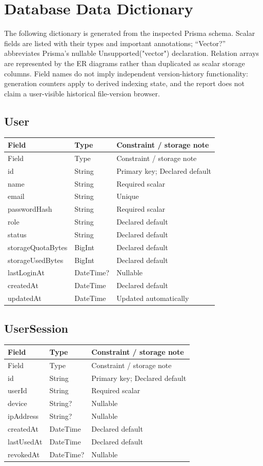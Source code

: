 \chapter{Database Data Dictionary}
The following dictionary is generated from the inspected Prisma schema. Scalar fields are listed with their types and important annotations; ``Vector?'' abbreviates Prisma's nullable Unsupported("vector") declaration. Relation arrays are represented by the ER diagrams rather than duplicated as scalar storage columns. Field names do not imply independent version-history functionality: generation counters apply to derived indexing state, and the report does not claim a user-visible historical file-version browser.

\section{User}
\begin{longtable}{p{.31\linewidth}p{.23\linewidth}p{.36\linewidth}}\toprule Field&Type&Constraint / storage note\\\midrule\endfirsthead\toprule Field&Type&Constraint / storage note\\\midrule\endhead
id&String&Primary key; Declared default\\
name&String&Required scalar\\
email&String&Unique\\
passwordHash&String&Required scalar\\
role&String&Declared default\\
status&String&Declared default\\
storageQuotaBytes&BigInt&Declared default\\
storageUsedBytes&BigInt&Declared default\\
lastLoginAt&DateTime?&Nullable\\
createdAt&DateTime&Declared default\\
updatedAt&DateTime&Updated automatically\\
\bottomrule\end{longtable}

\section{UserSession}
\begin{longtable}{p{.31\linewidth}p{.23\linewidth}p{.36\linewidth}}\toprule Field&Type&Constraint / storage note\\\midrule\endfirsthead\toprule Field&Type&Constraint / storage note\\\midrule\endhead
id&String&Primary key; Declared default\\
userId&String&Required scalar\\
device&String?&Nullable\\
ipAddress&String?&Nullable\\
createdAt&DateTime&Declared default\\
lastUsedAt&DateTime&Declared default\\
revokedAt&DateTime?&Nullable\\
\bottomrule\end{longtable}

